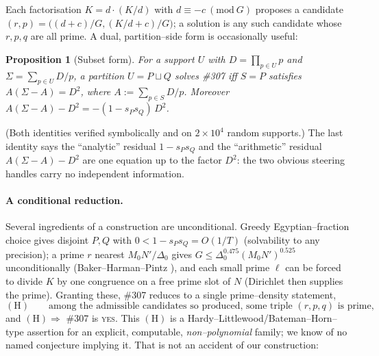 \documentclass[11pt]{article}
\newtheorem{proposition}[theorem]{Proposition}
\theoremstyle{definition}
\begin{document}
Each factorisation $K=d\cdot(K/d)$ with $d\equiv-c\ (\mathrm{mod}\ G)$ proposes a candidate
$(r,p)=\bigl((d+c)/G,(K/d+c)/G\bigr)$; a solution is any such candidate whose $r,p,q$ are all prime.
A dual, partition--side form is occasionally useful:

\begin{proposition}[Subset form]\label{prop:subset}
For a support $U$ with $D=\prod_{p\in U}p$ and $\Sigma=\sum_{p\in U}D/p$, a partition $U=P\sqcup Q$
solves \#307 iff $S=P$ satisfies $A(\Sigma-A)=D^2$, where $A:=\sum_{p\in S}D/p$. Moreover
$A(\Sigma-A)-D^2=-(1-s_Ps_Q)\,D^2$.
\end{proposition}

(Both identities verified symbolically and on $2\times10^4$ random supports.) The last identity says
the ``analytic'' residual $1-s_Ps_Q$ and the ``arithmetic'' residual $A(\Sigma-A)-D^2$ are one
equation up to the factor $D^2$: the two obvious steering handles carry no independent information.

\paragraph{A conditional reduction.} Several ingredients of a construction are unconditional. Greedy
Egyptian--fraction choice gives disjoint $P,Q$ with $0<1-s_Ps_Q=O(1/T)$ (solvability to any
precision); a prime $r$ nearest $M_0N'/\Delta_0$ gives $G\le\Delta_0^{0.475}(M_0N')^{0.525}$
unconditionally (Baker--Harman--Pintz \cite{BHP2001}), and each small prime $\ell$ can be forced to
divide $K$ by one congruence on a free prime slot of $N$ (Dirichlet then supplies the prime).
Granting these, \#307 reduces to a single prime--density statement,
\[
(\mathrm{H})\qquad\text{among the admissible candidates so produced, some triple $(r,p,q)$ is prime,}
\]
and $(\mathrm{H})\Rightarrow$ \#307 is \textsc{yes}. This $(\mathrm{H})$ is a
Hardy--Littlewood/Bateman--Horn--type assertion for an explicit, computable, \emph{non--polynomial}
family; we know of no named conjecture implying it. That is not an accident of our construction:
\end{document}
